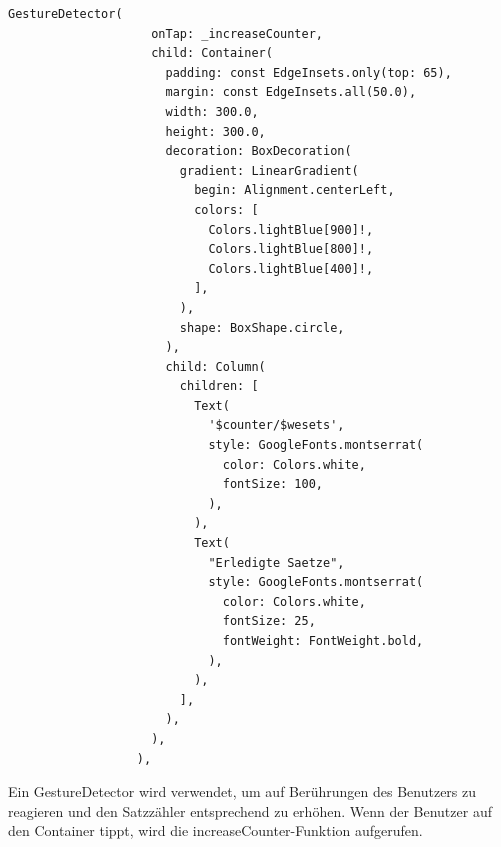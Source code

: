             \begin{lstlisting}[caption=GestureDetector,label=lst:impl:frontend:qrcode]
                GestureDetector(
                    onTap: _increaseCounter,
                    child: Container(
                      padding: const EdgeInsets.only(top: 65),
                      margin: const EdgeInsets.all(50.0),
                      width: 300.0,
                      height: 300.0,
                      decoration: BoxDecoration(
                        gradient: LinearGradient(
                          begin: Alignment.centerLeft,
                          colors: [
                            Colors.lightBlue[900]!,
                            Colors.lightBlue[800]!,
                            Colors.lightBlue[400]!,
                          ],
                        ),
                        shape: BoxShape.circle,
                      ),
                      child: Column(
                        children: [
                          Text(
                            '$counter/$wesets',
                            style: GoogleFonts.montserrat(
                              color: Colors.white,
                              fontSize: 100,
                            ),
                          ),
                          Text(
                            "Erledigte Saetze",
                            style: GoogleFonts.montserrat(
                              color: Colors.white,
                              fontSize: 25,
                              fontWeight: FontWeight.bold,
                            ),
                          ),
                        ],
                      ),
                    ),
                  ),
            \end{lstlisting}
            
            Ein GestureDetector wird verwendet, um auf Berührungen des Benutzers zu reagieren und den Satzzähler entsprechend zu erhöhen. Wenn der Benutzer auf den Container tippt, wird die increaseCounter-Funktion aufgerufen.
            \\

